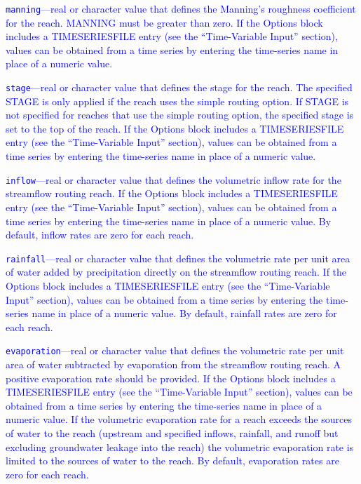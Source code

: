 \begin{description}
\item \textcolor{blue}{\texttt{manning}---real or character value that defines the Manning's roughness coefficient for the reach. MANNING must be greater than zero.  If the Options block includes a TIMESERIESFILE entry (see the ``Time-Variable Input'' section), values can be obtained from a time series by entering the time-series name in place of a numeric value.}

\item \textcolor{blue}{\texttt{stage}---real or character value that defines the stage for the reach. The specified STAGE is only applied if the reach uses the simple routing option. If STAGE is not specified for reaches that use the simple routing option, the specified stage is set to the top of the reach. If the Options block includes a TIMESERIESFILE entry (see the ``Time-Variable Input'' section), values can be obtained from a time series by entering the time-series name in place of a numeric value.}

\item \textcolor{blue}{\texttt{inflow}---real or character value that defines the volumetric inflow rate for the streamflow routing reach. If the Options block includes a TIMESERIESFILE entry (see the ``Time-Variable Input'' section), values can be obtained from a time series by entering the time-series name in place of a numeric value. By default, inflow rates are zero for each reach.}

\item \textcolor{blue}{\texttt{rainfall}---real or character value that defines the  volumetric rate per unit area of water added by precipitation directly on the streamflow routing reach. If the Options block includes a TIMESERIESFILE entry (see the ``Time-Variable Input'' section), values can be obtained from a time series by entering the time-series name in place of a numeric value. By default, rainfall  rates are zero for each reach.}

\item \textcolor{blue}{\texttt{evaporation}---real or character value that defines the volumetric rate per unit area of water subtracted by evaporation from the streamflow routing reach. A positive evaporation rate should be provided. If the Options block includes a TIMESERIESFILE entry (see the ``Time-Variable Input'' section), values can be obtained from a time series by entering the time-series name in place of a numeric value. If the volumetric evaporation rate for a reach exceeds the sources of water to the reach (upstream and specified inflows, rainfall, and runoff but excluding groundwater leakage into the reach) the volumetric evaporation rate is limited to the sources of water to the reach. By default, evaporation rates are zero for each reach.}


\end{description}
